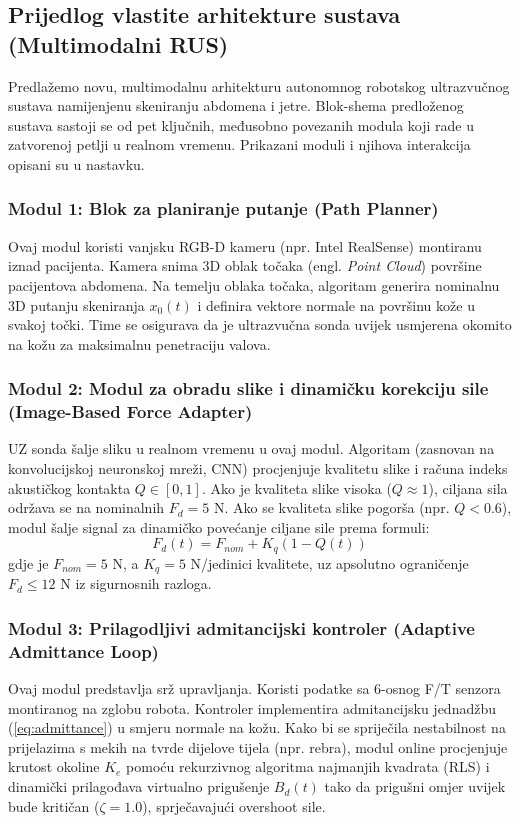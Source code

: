 \subsection{Prijedlog vlastite arhitekture sustava (Multimodalni RUS)}
Predlažemo novu, multimodalnu arhitekturu autonomnog robotskog ultrazvučnog sustava namijenjenu skeniranju abdomena i jetre. Blok-shema predloženog sustava sastoji se od pet ključnih, međusobno povezanih modula koji rade u zatvorenoj petlji u realnom vremenu. Prikazani moduli i njihova interakcija opisani su u nastavku.

\subsubsection{Modul 1: Blok za planiranje putanje (Path Planner)}
Ovaj modul koristi vanjsku RGB-D kameru (npr. Intel RealSense) montiranu iznad pacijenta. Kamera snima 3D oblak točaka (engl. \textit{Point Cloud}) površine pacijentova abdomena. Na temelju oblaka točaka, algoritam generira nominalnu 3D putanju skeniranja $x_0(t)$ i definira vektore normale na površinu kože u svakoj točki. Time se osigurava da je ultrazvučna sonda uvijek usmjerena okomito na kožu za maksimalnu penetraciju valova.

\subsubsection{Modul 2: Modul za obradu slike i dinamičku korekciju sile (Image-Based Force Adapter)}
UZ sonda šalje sliku u realnom vremenu u ovaj modul. Algoritam (zasnovan na konvolucijskoj neuronskoj mreži, CNN) procjenjuje kvalitetu slike i računa indeks akustičkog kontakta $Q \in [0, 1]$. 
Ako je kvaliteta slike visoka ($Q \approx 1$), ciljana sila održava se na nominalnih $F_d = 5$ N. Ako se kvaliteta slike pogorša (npr. $Q < 0.6$), modul šalje signal za dinamičko povećanje ciljane sile prema formuli:
\begin{equation}
    F_d(t) = F_{nom} + K_q (1 - Q(t))
\label{eq:dynamic_force}
\end{equation}
gdje je $F_{nom} = 5$ N, a $K_q = 5$ N/jedinici kvalitete, uz apsolutno ograničenje $F_d \le 12$ N iz sigurnosnih razloga.

\subsubsection{Modul 3: Prilagodljivi admitancijski kontroler (Adaptive Admittance Loop)}
Ovaj modul predstavlja srž upravljanja. Koristi podatke sa 6-osnog F/T senzora montiranog na zglobu robota. Kontroler implementira admitancijsku jednadžbu (\ref{eq:admittance}) u smjeru normale na kožu. Kako bi se spriječila nestabilnost na prijelazima s mekih na tvrde dijelove tijela (npr. rebra), modul online procjenjuje krutost okoline $K_e$ pomoću rekurzivnog algoritma najmanjih kvadrata (RLS) i dinamički prilagođava virtualno prigušenje $B_d(t)$ tako da prigušni omjer uvijek bude kritičan ($\zeta = 1.0$), sprječavajući overshoot sile.

